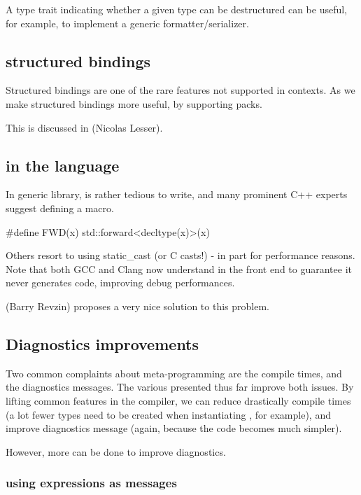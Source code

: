 \documentclass{wg21}
\begin{document}
A type trait indicating whether a given type can be destructured can be useful, for example, to implement a generic
formatter/serializer.

\subsection{ structured bindings}

Structured bindings are one of the rare features not supported in  contexts.
As we make structured bindings more useful, by supporting packs.

This is discussed in (Nicolas Lesser).

\subsection{ in the language}

In generic library,  is rather tedious to write, and
many prominent C++ experts suggest defining a macro.

\begin{colorblock}
#define FWD(x) std::forward<decltype(x)>(x)
\end{colorblock}

Others resort to using static_cast (or C casts!) - in part for performance reasons.
Note that both GCC and Clang now understand  in the front end to guarantee it never generates code,
improving debug performances.

 (Barry Revzin) proposes a very nice solution to this problem.

\subsection{Diagnostics improvements}

Two common complaints about meta-programming are the compile times,
and the diagnostics messages.
The various presented thus far improve both issues. By lifting common features in the compiler,
we can reduce drastically compile times (a lot fewer types need to be created when instantiating , for example), and improve diagnostics message (again, because the code becomes much simpler).

However, more can be done to improve diagnostics.

\subsubsection{ using expressions as messages}
\end{document}
